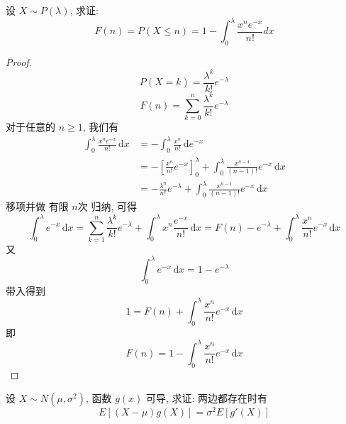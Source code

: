 \documentclass[../main.tex]{subfiles}
\begin{document}
\begin{exercise}{}{}
设 $X \sim P(\lambda)$, 求证:
\[
F(n) = P(X \le n) = 1 - \int_{0}^{\lambda} \frac{x^n e^{-x}}{n!} dx
\]
\end{exercise}
\begin{proof}
     \[
     P\left( X= k \right)= \frac{ \lambda ^{k} }{k! }e^{- \lambda }  
     \] \[
     F\left( n \right)= \sum _{k= 0}^{n}\frac{ \lambda ^{k} }{k! }e^{- \lambda }  
     \]对于任意的 \(  n\ge 1  \), 我们有  \[
   \begin{aligned}
     \int_{0}^{ \lambda }\frac{x^{n}e^{-x} }{n! }\,\mathrm{d} x&= - \int_{0}^{ \lambda } \frac{x^{n} }{n! }\,\mathrm{d} e^{-x}  \\ 
      &=  -\left[ \frac{x^{n} }{n! }e^{-x} \right]_{0}^{ \lambda }+  \int_{0}^{ \lambda }\frac{x^{n- 1} }{\left( n-1 \right)!  } e^{-x}  \,\mathrm{d} x\\ 
       &= - \frac{ \lambda ^{n} }{n! }e^{- \lambda }+ \int_{0}^{ \lambda } \frac{x^{n-1} }{\left( n-1 \right)!  }e^{-x}\,\mathrm{d} x 
   \end{aligned}
     \]移项并做 有限 \(  n  \)次 归纳, 可得 \[
     \int_{0}^{ \lambda } e^{-x}\,\mathrm{d} x=  \sum _{k= 1}^{n} \frac{ \lambda ^{k} }{k! }e^{- \lambda }+  \int_{0}^{ \lambda }x^{n}\frac{e^{-x} }{n! }\,\mathrm{d} x  = F\left( n \right)-e^{- \lambda }+ \int_{0}^{ \lambda }\frac{x^{n} }{n! }e^{-x}\,\mathrm{d} x  
     \]又 \[
     \int_{0}^{ \lambda }e^{-x}\,\mathrm{d} x= 1-e^{- \lambda }
     \]带入得到 \[
     1= F\left( n \right)+ \int_{0}^{ \lambda }\frac{x^{n} }{n! }e^{-x}\,\mathrm{d} x  
     \]即 \[
     F\left( n \right)=  1-\int_{0}^{ \lambda }\frac{x^{n} }{n! }e^{-x}\,\mathrm{d} x  
     \]
\end{proof}
\begin{exercise}{}{}
设 $X \sim N(\mu, \sigma^2)$, 函数 $g(x)$ 可导, 求证: 两边都存在时有
\[
E[(X - \mu)g(X)] = \sigma^2 E[g'(X)]
\]
\end{exercise}
\end{document}
